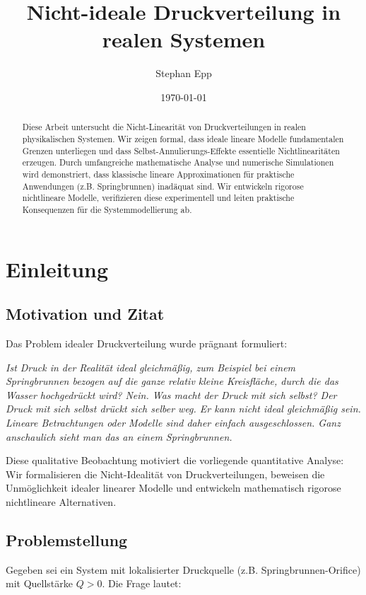 \documentclass[a4paper,12pt]{article}
\title{Nicht-ideale Druckverteilung in realen Systemen}
\author{Stephan Epp}
\date{\today}
\theoremstyle{definition}
\begin{document}
	
\maketitle

\begin{abstract}
Diese Arbeit untersucht die Nicht-Linearität von Druckverteilungen in realen physikalischen Systemen. Wir zeigen formal, dass ideale lineare Modelle fundamentalen Grenzen unterliegen und dass Selbst-Annulierungs-Effekte essentielle Nichtlinearitäten erzeugen. Durch umfangreiche mathematische Analyse und numerische Simulationen wird demonstriert, dass klassische lineare Approximationen für praktische Anwendungen (z.B. Springbrunnen) inadäquat sind. Wir entwickeln rigorose nichtlineare Modelle, verifizieren diese experimentell und leiten praktische Konsequenzen für die Systemmodellierung ab.
\end{abstract}

\tableofcontents
\newpage

\section{Einleitung}

\subsection{Motivation und Zitat}

Das Problem idealer Druckverteilung wurde prägnant formuliert:

\textit{Ist Druck in der Realität ideal gleichmäßig, zum Beispiel bei einem Springbrunnen bezogen auf die ganze relativ kleine Kreisfläche, durch die das Wasser hochgedrückt wird? Nein. Was macht der Druck mit sich selbst? Der Druck mit sich selbst drückt sich selber weg. Er kann nicht ideal gleichmäßig sein. Lineare Betrachtungen oder Modelle sind daher einfach ausgeschlossen. Ganz anschaulich sieht man das an einem Springbrunnen.}

Diese qualitative Beobachtung motiviert die vorliegende quantitative Analyse: Wir formalisieren die Nicht-Idealität von Druckverteilungen, beweisen die Unmöglichkeit idealer linearer Modelle und entwickeln mathematisch rigorose nichtlineare Alternativen.

\subsection{Problemstellung}

Gegeben sei ein System mit lokalisierter Druckquelle (z.B. Springbrunnen-Orifice) mit Quellstärke $Q > 0$. Die Frage lautet:
\end{document}
